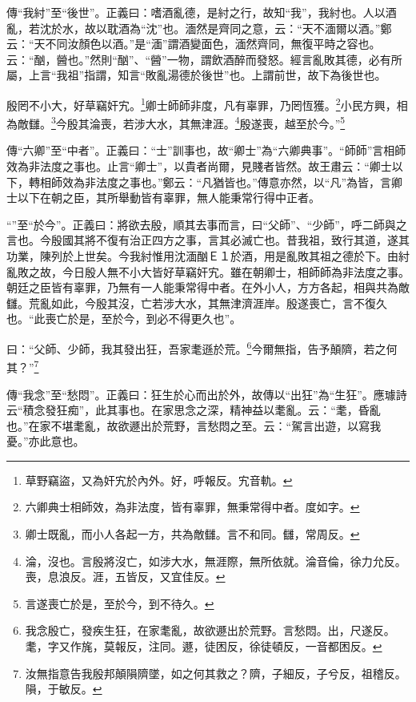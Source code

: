 {\noindent\zhuan{}\fzbyks 傳“我紂”至“後世”。正義曰：嗜酒亂德，是紂之行，故知“我”，我紂也。人以酒亂，若沈於水，故以耽酒為“沈”也。湎然是齊同之意，云：“天不湎爾以酒。”鄭云：“天不同汝顏色以酒。”是“湎”謂酒變面色，湎然齊同，無復平時之容也。云：“酗，醟也。”然則“酗”、“醟”一物，謂飲酒醉而發怒。經言亂敗其德，必有所屬，上言“我祖”指謂，知言“敗亂湯德於後世”也。上謂前世，故下為後世也。 \par}

殷罔不小大，好草竊奸宄。\footnote{草野竊盜，又為奸宄於內外。好，呼報反。宄音軌。}卿士師師非度，凡有辜罪，乃罔恆獲。\footnote{六卿典士相師效，為非法度，皆有辜罪，無秉常得中者。度如字。}小民方興，相為敵讎。\footnote{卿士既亂，而小人各起一方，共為敵讎。言不和同。讎，常周反。}今殷其淪喪，若涉大水，其無津涯。\footnote{淪，沒也。言殷將沒亡，如涉大水，無涯際，無所依就。淪音倫，徐力允反。喪，息浪反。涯，五皆反，又宜佳反。}殷遂喪，越至於今。”\footnote{言遂喪亡於是，至於今，到不待久。}

{\noindent\zhuan{}\fzbyks 傳“六卿”至“中者”。正義曰：“士”訓事也，故“卿士”為“六卿典事”。“師師”言相師效為非法度之事也。止言“卿士”，以貴者尚爾，見賤者皆然。故王肅云：“卿士以下，轉相師效為非法度之事也。”鄭云：“凡猶皆也。”傳意亦然，以“凡”為皆，言卿士以下在朝之臣，其所舉動皆有辜罪，無人能秉常行得中正者。 \par}

{\noindent\shu{}\fzkt “”至“於今”。正義曰：將欲去殷，順其去事而言，曰“父師”、“少師”，呼二師與之言也。今殷國其將不復有治正四方之事，言其必滅亡也。昔我祖，致行其道，遂其功業，陳列於上世矣。今我紂惟用沈湎酗Ｅ１於酒，用是亂敗其祖之德於下。由紂亂敗之故，今日殷人無不小大皆好草竊奸宄。雖在朝卿士，相師師為非法度之事。朝廷之臣皆有辜罪，乃無有一人能秉常得中者。在外小人，方方各起，相與共為敵讎。荒亂如此，今殷其沒，亡若涉大水，其無津濟涯岸。殷遂喪亡，言不復久也。“此喪亡於是，至於今，到必不得更久也”。 \par}

曰：“父師、少師，我其發出狂，吾家耄遜於荒。\footnote{我念殷亡，發疾生狂，在家耄亂，故欲遯出於荒野。言愁悶。出，尺遂反。耄，字又作旄，莫報反，注同。遯，徒困反，徐徒頓反，一音都困反。}今爾無指，告予顛隮，若之何其？”\footnote{汝無指意告我殷邦顛隕隮墜，如之何其救之？隮，子細反，子兮反，祖稽反。隕，于敏反。}


{\noindent\zhuan{}\fzbyks 傳“我念”至“愁悶”。正義曰：狂生於心而出於外，故傳以“出狂”為“生狂”。應璩詩云“積念發狂痴”，此其事也。在家思念之深，精神益以耄亂。云：“耄，昏亂也。”在家不堪耄亂，故欲遯出於荒野，言愁悶之至。云：“駕言出遊，以寫我憂。”亦此意也。 \par}


